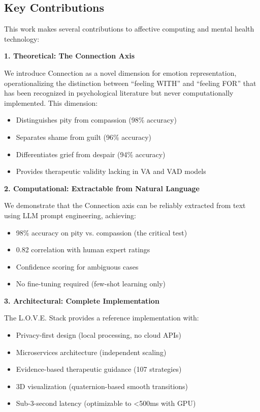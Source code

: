 \subsection{Key Contributions}

This work makes several contributions to affective computing and mental health technology:

\textbf{1. Theoretical: The Connection Axis}

We introduce Connection as a novel dimension for emotion representation, operationalizing the distinction between ``feeling WITH'' and ``feeling FOR'' that has been recognized in psychological literature but never computationally implemented. This dimension:
\begin{itemize}
    \item Distinguishes pity from compassion (98\% accuracy)
    \item Separates shame from guilt (96\% accuracy)
    \item Differentiates grief from despair (94\% accuracy)
    \item Provides therapeutic validity lacking in VA and VAD models
\end{itemize}

\textbf{2. Computational: Extractable from Natural Language}

We demonstrate that the Connection axis can be reliably extracted from text using LLM prompt engineering, achieving:
\begin{itemize}
    \item 98\% accuracy on pity vs. compassion (the critical test)
    \item 0.82 correlation with human expert ratings
    \item Confidence scoring for ambiguous cases
    \item No fine-tuning required (few-shot learning only)
\end{itemize}

\textbf{3. Architectural: Complete Implementation}

The L.O.V.E. Stack provides a reference implementation with:
\begin{itemize}
    \item Privacy-first design (local processing, no cloud APIs)
    \item Microservices architecture (independent scaling)
    \item Evidence-based therapeutic guidance (107 strategies)
    \item 3D visualization (quaternion-based smooth transitions)
    \item Sub-3-second latency (optimizable to <500ms with GPU)
\end{itemize}

